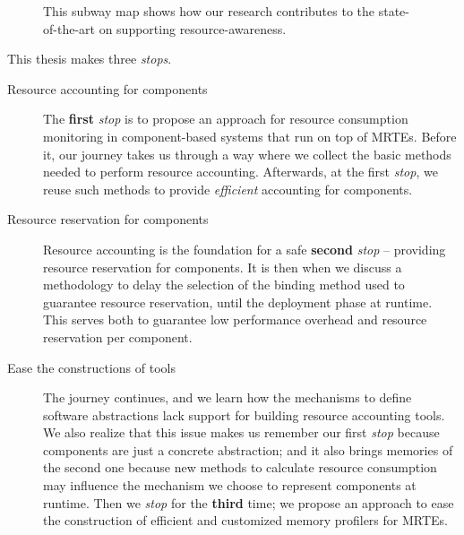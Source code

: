 {\begin{figure}[!ht]
\caption{This subway map shows how our research contributes to the state-of-the-art on supporting resource-awareness.} \label{fig:subway-map}
\end{figure}

}


This thesis makes three \textit{stops}.
\begin{description}
\item[Resource accounting for components] The \textbf{first} \textit{stop} is to propose an approach for resource consumption monitoring in component-based systems that run on top of MRTEs.
Before it, our journey takes us through a way where we collect the basic methods needed to perform resource accounting.
Afterwards, at the first \textit{stop}, we reuse such methods to provide \textit{efficient} accounting for components.

\item[Resource reservation for components] Resource accounting is the foundation for a safe \textbf{second} \textit{stop} -- providing resource reservation for components.
It is then when we discuss a methodology to delay the selection of the binding method used to guarantee resource reservation, until the deployment phase at runtime.
This serves both to guarantee low performance overhead and resource reservation per component.

\item[Ease the constructions of tools] The journey continues, and we learn how the mechanisms to define software abstractions lack support for building resource accounting tools.
We also realize that this issue makes us remember our first \textit{stop} because components are just a concrete abstraction; and it also brings memories of the second one because new methods to calculate resource consumption may influence the mechanism we choose to represent components at runtime. 
Then we \textit{stop} for the \textbf{third} time; we propose an approach to ease the construction of efficient and customized memory profilers for MRTEs.
\end{description}

\newpage\thispagestyle{empty}\addtocounter{page}{-1}



